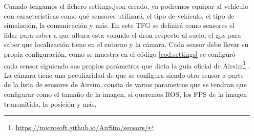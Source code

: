 Cuando tengamos el fichero settings.json creado, ya podremos equipar al vehículo con características como qué sensores utilizará, 
el tipo de vehículo, el tipo de simulación, la comunicación y más. En este TFG se definirá como sensores el lidar para saber a que áltura esta volando 
el dron respecto al suelo, el gps para saber que localización tiene en el entorno y la cámara. Cada sensor debe llevar su propia configuración, como se muestra 
en el código \ref{cod:settings} se configuró cada sensor siguiendo sus propios parámetros que dicta la guía oficial de Airsim\footnote{\url{https://microsoft.github.io/AirSim/sensors/}}
. La cámara tiene una peculiaridad de que se configura siendo otro sensor a parte de la lista de sensores de Airsim, consta de varios parametros que se tendran que configurar como 
el tamaño de la imagen, si queremos ROS, los FPS de la imagen transmitida, la posición y más.

